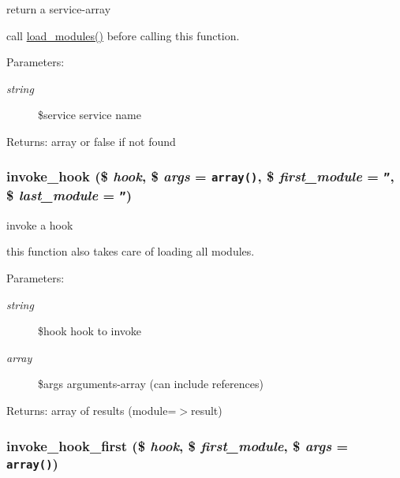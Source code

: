 return a service-array

call \hyperlink{modules_8inc_8php_23f8be02dc2148a3c860119a1d6ea276}{load\_\-modules()} before calling this function. \begin{Desc}
\item[Parameters:]
\begin{description}
\item[{\em string}]\$service service name \end{description}
\end{Desc}
\begin{Desc}
\item[Returns:]array or false if not found \end{Desc}
\hypertarget{modules_8inc_8php_92ef7c094f294cfec43a3bb53227a21a}{
\subsubsection[{invoke\_\-hook}]{\setlength{\rightskip}{0pt plus 5cm}invoke\_\-hook (\$ {\em hook}, \/  \$ {\em args} = {\tt array()}, \/  \$ {\em first\_\-module} = {\tt ''}, \/  \$ {\em last\_\-module} = {\tt ''})}}
\label{modules_8inc_8php_92ef7c094f294cfec43a3bb53227a21a}


invoke a hook

this function also takes care of loading all modules. \begin{Desc}
\item[Parameters:]
\begin{description}
\item[{\em string}]\$hook hook to invoke \item[{\em array}]\$args arguments-array (can include references) \end{description}
\end{Desc}
\begin{Desc}
\item[Returns:]array of results (module=$>$result) \end{Desc}
\hypertarget{modules_8inc_8php_cac937809bdb98ce29616134e43050ed}{
\subsubsection[{invoke\_\-hook\_\-first}]{\setlength{\rightskip}{0pt plus 5cm}invoke\_\-hook\_\-first (\$ {\em hook}, \/  \$ {\em first\_\-module}, \/  \$ {\em args} = {\tt array()})}}
\label{modules_8inc_8php_cac937809bdb98ce29616134e43050ed}


